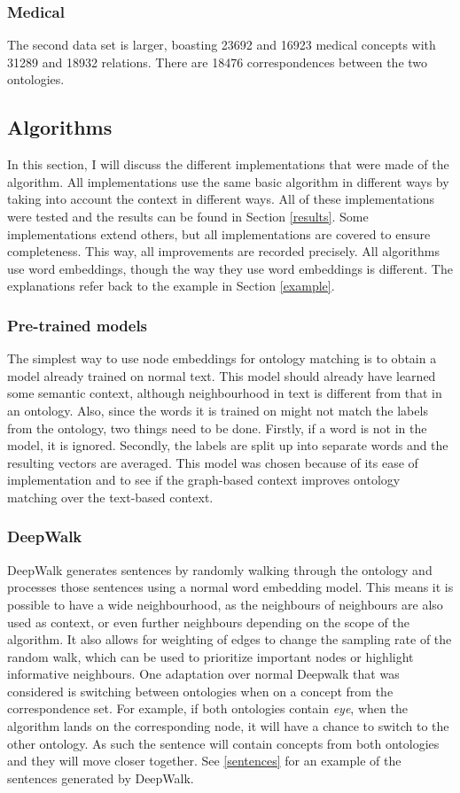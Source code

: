\documentclass{article}
\begin{document}
 \subsubsection{Medical}
 The second data set is larger, boasting 23692 and 16923 medical concepts with 31289 and 18932 relations. There are 18476 correspondences between the two ontologies.
 
 \subsection{Algorithms} \label{implementations}
 In this section, I will discuss the different implementations that were made of the algorithm. All implementations use the same basic algorithm in different ways by taking into account the context in different ways. All of these implementations were tested and the results can be found in Section \ref{results}. Some implementations extend others, but all implementations are covered to ensure completeness. This way, all improvements are recorded precisely.
 All algorithms use word embeddings, though the way they use word embeddings is different.  The explanations refer back to the example in Section \ref{example}.
  \subsubsection{Pre-trained models}
  The simplest way to use node embeddings for ontology matching is to obtain a model already trained on normal text. This model should already have learned some semantic context, although neighbourhood in text is different from that in an ontology. Also, since the words it is trained on might not match the labels from the ontology, two things need to be done. Firstly, if a word is not in the model, it is ignored. Secondly, the labels are split up into separate words and the resulting vectors are averaged.
  This model was chosen because of its ease of implementation and to see if the graph-based context improves ontology matching over the text-based context.
  \subsubsection{DeepWalk}
  DeepWalk generates sentences by randomly walking through the ontology and processes those sentences using a normal word embedding model. This means it is possible to have a wide neighbourhood, as the neighbours of neighbours are also used as context, or even further neighbours depending on the scope of the algorithm. It also allows for weighting of edges to change the sampling rate of the random walk, which can be used to prioritize important nodes or highlight informative neighbours.
  One adaptation over normal Deepwalk that was considered is switching between ontologies when on a concept from the correspondence set. For example, if both ontologies contain \textit{eye}, when the algorithm lands on the corresponding node, it will have a chance to switch to the other ontology. As such the sentence will contain concepts from both ontologies and they will move closer together. See \ref{sentences} for an example of the sentences generated by DeepWalk.
\end{document}
